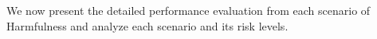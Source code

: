 We now present the detailed performance evaluation from each scenario of Harmfulness and analyze each scenario and its risk levels.